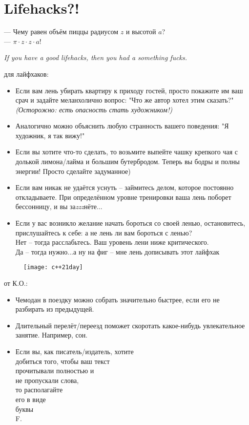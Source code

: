 \section{Lifehacks?!}
\begin{epigraph}
    --- Чему равен объём пиццы радиусом \( z \) и высотой \( a \)?\\
    --- \( \pi\cdot z\cdot z\cdot a \)!
\end{epigraph}

\noindent\emph{If you have a good lifehacks, then you had a something fucks.}

 для лайфхаков:
\begin{itemize}
    \item Если вам лень убирать квартиру к приходу гостей, просто покажите им ваш срач и задайте меланхолично вопрос: "Что же автор хотел этим сказать?" \emph{(Осторожно: есть опасность стать художником!)}
    \item Аналогично можно объяснить любую странность вашего поведения: "Я художник, я так вижу!"
    \item Если вы хотите что-то сделать, то возьмите выпейте чашку крепкого чая с долькой лимона/лайма и большим бутербродом. Теперь вы бодры и полны энергии! Просто сделайте задуманное)
    \item Если вам никак не удаётся уснуть -- займитесь делом, которое постоянно откладываете. При определённом уровне тренировки ваша лень поборет бессонницу, и вы за\emph{zzz}нёте...
    \item Если у вас возникло желание начать бороться со своей ленью, остановитесь, прислушайтесь к себе: а не лень ли вам бороться с ленью?\\
        Нет -- тогда расслабьтесь. Ваш уровень лени ниже критического.\\
        Да -- тогда нужно...а ну на фиг -- мне лень дописывать этот лайфхак
\end{itemize}

\pagebreak

\begin{figure}[ht!]
    \centering
    \texttt{[image: c++21day]}
\end{figure}

 от К.О.:
\begin{itemize}
    \item Чемодан в поездку можно собрать значительно быстрее, если его не разбирать из предыдущей.
    \item Длительный перелёт/переезд поможет скоротать какое-нибудь увлекательное занятие. Например, сон.
    \item Если вы, как писатель/издатель, хотите \\ добиться того, чтобы ваш текст \\
        прочитывали полностью и \\
        не пропускали слова, \\
        то располагайте \\
        его в виде \\
        буквы \\
        F.
\end{itemize}